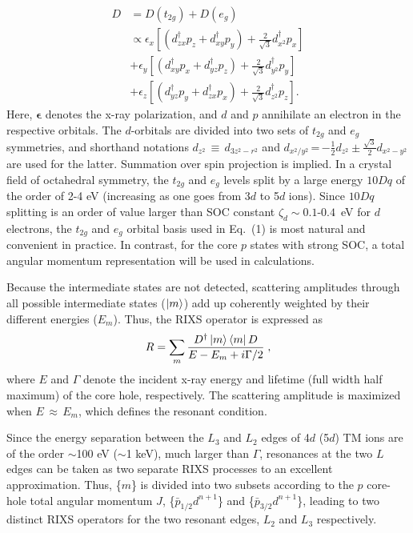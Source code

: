 \documentclass[twocolumn,prb,aps,showpacs,superscriptaddress]{revtex4-1}
\begin{document}
\begin{align}
D&=D(t_{2g})+D(e_{g})\nonumber\\
&\propto\epsilon_x [(d_{zx}^\dagger p_z+d_{xy}^\dagger p_y) 
+ \tfrac{2}{\sqrt{3}} d_{x^2}^\dagger p_x] \nonumber \\
 &+\epsilon_y [(d_{xy}^\dagger p_x+d_{yz}^\dagger p_z) 
+ \tfrac{2}{\sqrt{3}} d_{y^2}^\dagger p_y] \nonumber \\
 &+\epsilon_z [(d_{yz}^\dagger p_y+d_{zx}^\dagger p_x) 
+ \tfrac{2}{\sqrt{3}} d_{z^2}^\dagger p_z]. 
\end{align}
\noindent
Here, $\bm{\epsilon}$ denotes the x-ray polarization, and $d$ and $p$
annihilate an electron in the respective orbitals. The $d$-orbitals are
divided into two sets of $t_{2g}$ and $e_g$ symmetries, and shorthand notations 
$d_{z^2}$\,$\equiv$\,$d_{3z^2-r^2}$ and 
$d_{x^2/y^2}$\,=\,$-\tfrac{1}{2}d_{z^2} \pm\tfrac{\sqrt 3}{2} d_{x^2-y^2}$ are used
for the latter. Summation over spin projection is implied. %
In a crystal field 
of octahedral symmetry, the $t_{2g}$ and $e_g$ levels split by a large energy 
$10Dq$ of the order of 2-4 eV (increasing as one goes from 3$d$ to 5$d$ ions). 
Since $10Dq$ splitting is an order of value larger than SOC constant 
$\zeta_d\sim 0.1$-$0.4$~eV for $d$ electrons, the $t_{2g}$ and $e_g$ orbital 
basis used in Eq.~(1) is most natural and convenient in practice. In contrast, 
for the core $p$ states with strong SOC, a total angular momentum 
representation will be used in calculations. 

Because the intermediate states are not detected, scattering amplitudes 
through all possible intermediate states ($\ket{m}$) add up coherently 
weighted by their different energies ($E_m$). Thus, the RIXS operator is 
expressed as 
\begin{equation}
R=\sum_m \frac{D^\dagger \ket{m}\bra{m} D}{E-E_m+i\Gamma/2}\;,
\end{equation}
where $E$ and $\Gamma$ denote the incident x-ray energy and lifetime (full
width half maximum) of the core hole, respectively. The scattering amplitude
is maximized when $E$\,$\approx$\,$E_m$, which defines the resonant condition.  

Since the energy separation between the $L_3$ and $L_2$ edges of 4$d$ (5$d$)
TM ions are of the order $\sim$100 eV ($\sim$1 keV), much larger than
$\Gamma$, resonances at the two $L$ edges can be taken as two separate RIXS
processes to an excellent approximation. Thus, \{$m$\} is divided into two
subsets according to the $p$ core-hole total angular momentum $J$,
\{$\bar{p}_{1/2}d^{n+1}$\} and \{$\bar{p}_{3/2}d^{n+1}$\}, leading to two
distinct RIXS operators for the two resonant edges, $L_2$ and $L_3$
respectively. 
\end{document}
